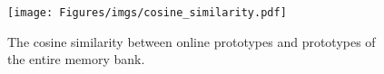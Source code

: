 \begin{figure}
    \centering
    \texttt{[image: Figures/imgs/cosine\_similarity.pdf]}
    \caption{The cosine similarity between online prototypes and prototypes of the entire memory bank.}
    \label{fig:cosine_similarity}
\end{figure}